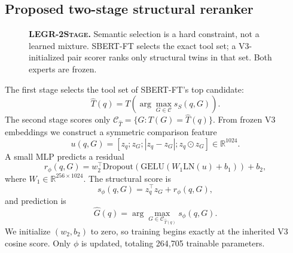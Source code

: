 \documentclass{article}
\newcommand{\method}{\textsc{LEGR-2Stage}}
\newcommand{\sbert}{\textsc{SBERT-FT}}
\begin{document}
\subsection{Proposed two-stage structural reranker}

\begin{figure}[t]
\centering
{}
\caption{\textbf{\method{}.}  Semantic selection is a hard constraint, not a learned mixture.  \sbert{} selects the exact tool set; a V3-initialized pair scorer ranks only structural twins in that set.  Both experts are frozen.}
\label{fig:twostage}
\end{figure}

The first stage selects the tool set of \sbert{}'s top candidate:
\begin{equation}
    \widehat T(q)=T\!\left(\arg\max_{G\in\mathcal C}s_S(q,G)\right).
    \label{eq:stage1}
\end{equation}
The second stage scores only $\mathcal C_{\widehat T}=\{G:T(G)=\widehat T(q)\}$.
From frozen V3 embeddings we construct a symmetric comparison feature
\begin{equation}
    u(q,G)=[z_q;z_G;|z_q-z_G|;z_q\odot z_G]\in\mathbb R^{1024}.
\end{equation}
A small MLP predicts a residual
\begin{equation}
    r_\phi(q,G)=w_2^\top\mathrm{Dropout}\!\left(
    \mathrm{GELU}(W_1\mathrm{LN}(u)+b_1)\right)+b_2,
\end{equation}
where $W_1\in\mathbb R^{256\times1024}$.
The structural score is
\begin{equation}
    s_\phi(q,G)=z_q^\top z_G+r_\phi(q,G),
\end{equation}
and prediction is
\begin{equation}
    \hat G(q)=\arg\max_{G\in\mathcal C_{\widehat T(q)}}s_\phi(q,G).
    \label{eq:stage2}
\end{equation}
We initialize $(w_2,b_2)$ to zero, so training begins exactly at the inherited V3 cosine score.
Only $\phi$ is updated, totaling 264,705 trainable parameters.
\end{document}
